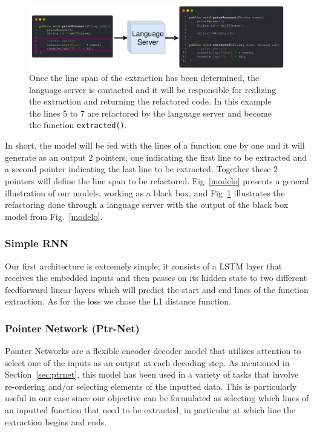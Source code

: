 \begin{figure}[!ht]
\centering
\centerline{\includegraphics[scale=0.33]{figuras/lsp_refac.png}}
\caption{Once the line span of the extraction has been determined, the language server is contacted and it will be responsible for realizing the extraction and returning the refactored code. In this example the lines 5 to 7 are refactored by the language server and become the function \texttt{extracted()}.}
\label{lsp_refac}
\end{figure}

 In short, the model will be fed with the lines of a function one by one and it will generate as an output 2 pointers, one indicating the first line to be extracted and a second pointer indicating the last line to be extracted. Together these 2 pointers will define the line span to be refactored. Fig~\ref{modelo} presents a general illustration of our models, working as a black box, and Fig~\ref{lsp_refac} illustrates the refactoring done through a language server with the output of the black box model from Fig.~\ref{modelo}.



\subsubsection{Simple RNN}

Our first architecture is extremely simple; it consists of a LSTM layer that receives the embedded inputs and then passes on its hidden state to two different feedforward linear layers which will predict the start and end lines of the function extraction. 
As for the loss we chose the L1 distance function.



\subsubsection{Pointer Network (Ptr-Net)}

 Pointer Networks \citep{pointer} are a flexible encoder decoder model that utilizes attention to select one of the inputs as an output at each decoding step. As mentioned in Section~\ref{sec:ptrnet}, this model has been used in a variety of tasks that involve re-ordering and/or selecting elements of the inputted data. This is particularly useful in our case since our objective can be formulated as selecting which lines of an inputted function that need to be extracted, in particular at which line the extraction begins and ends. 


